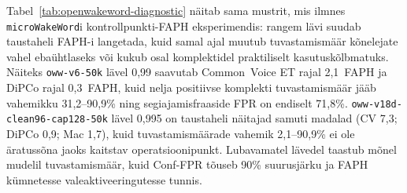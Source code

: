 \begin{table}[H]
\centering
\caption[openWakeWordi diagnostilised operatsioonipunktid]{Valitud \texttt{openWakeWord}i diagnostilised operatsioonipunktid. \enquote{Tuv. vahemik} on nelja olemasoleva positiivse proovikomplekti minimaalne--maksimaalne tuvastamismäär; Conf-FPR on \texttt{neg\_kuule\_kule\_confusables} komplekti valeaktiveeringu määr. FAPH-veerud on skriptitud taasmängu punkthinnangud vastavatel taustaheliradadel. Tabelit kasutatakse kompromissi illustreerimiseks, mitte lõplikuks raamistike paremusjärjestuseks.}
\label{tab:openwakeword-diagnostic}
\scriptsize
\setlength{\tabcolsep}{3pt}
\end{table}

Tabel~\ref{tab:openwakeword-diagnostic} näitab sama mustrit, mis ilmnes \texttt{microWakeWord}i kontrollpunkti-FAPH eksperimendis: rangem lävi suudab taustaheli FAPH-i langetada, kuid samal ajal muutub tuvastamismäär kõnelejate vahel ebaühtlaseks või kukub osal komplektidel praktiliselt kasutuskõlbmatuks. Näiteks \texttt{oww-v6-50k} lävel 0,99 saavutab Common~Voice ET rajal 2,1~FAPH ja DiPCo rajal 0,3~FAPH, kuid nelja positiivse komplekti tuvastamismäär jääb vahemikku 31,2--90,9\% ning segiajamisfraaside FPR on endiselt 71,8\%. \texttt{oww-v18d-clean96-cap128-50k} lävel 0,995 on taustaheli näitajad samuti madalad (CV 7,3; DiPCo 0,9; Mac 1,7), kuid tuvastamismäärade vahemik 2,1--90,9\% ei ole äratussõna jaoks kaitstav operatsioonipunkt. Lubavamatel lävedel taastub mõnel mudelil tuvastamismäär, kuid Conf-FPR tõuseb 90\% suurusjärku ja FAPH kümnetesse valeaktiveeringutesse tunnis.

